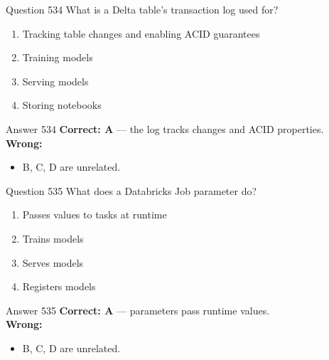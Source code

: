 \documentclass[aspectratio=169,11pt]{beamer}
\begin{document}
	\begin{frame}{Question 534}
		What is a Delta table's transaction log used for?
		\begin{enumerate}[label=\Alph*.]
			\item Tracking table changes and enabling ACID guarantees
			\item Training models
			\item Serving models
			\item Storing notebooks
		\end{enumerate}
	\end{frame}
	\begin{frame}{Answer 534}
		\textbf{Correct: A} --- the log tracks changes and ACID properties.\\
		\vspace{0.5em}
		\textbf{Wrong:}
		\begin{itemize}
			\item B, C, D are unrelated.
		\end{itemize}
	\end{frame}
	
	\begin{frame}{Question 535}
		What does a Databricks Job parameter do?
		\begin{enumerate}[label=\Alph*.]
			\item Passes values to tasks at runtime
			\item Trains models
			\item Serves models
			\item Registers models
		\end{enumerate}
	\end{frame}
	\begin{frame}{Answer 535}
		\textbf{Correct: A} --- parameters pass runtime values.\\
		\vspace{0.5em}
		\textbf{Wrong:}
		\begin{itemize}
			\item B, C, D are unrelated.
		\end{itemize}
	\end{frame}
	
\end{document}
